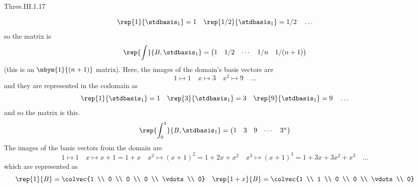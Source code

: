 \begin{ans}{Three.III.1.17}
\begin{exparts}
\begin{equation*}
            \rep{1}{\stdbasis_1}=1
            \quad \rep{1/2}{\stdbasis_1}=1/2
            \quad \ldots
          \end{equation*}
          so the matrix is
          \begin{equation*}
            \rep{\int}{B,\stdbasis_1}
            =\begin{pmatrix}
              1  &1/2 &\cdots  &1/n    &1/(n+1)
            \end{pmatrix}
          \end{equation*}
          (this is an $\nbym{1}{(n+1)}$ matrix).
        \partsitem Here, the images of the domain's basis vectors are
          \begin{equation*}
            1\mapsto 1
            \quad x\mapsto 3
            \quad x^2\mapsto 9
            \quad \ldots
          \end{equation*}
          and they are represented in the codomain as
          \begin{equation*}
            \rep{1}{\stdbasis_1}=1
            \quad\rep{3}{\stdbasis_1}=3
            \quad\rep{9}{\stdbasis_1}=9
            \quad \ldots
          \end{equation*}
          and so the matrix is this.
          \begin{equation*}
            \rep{\int_0^1}{B,\stdbasis_1}
            =\begin{pmatrix}
              1  &3   &9  &\cdots  &3^n
            \end{pmatrix}
          \end{equation*}
        \partsitem The images of the basis vectors from the domain are
          \begin{equation*}
          1\mapsto 1
          \quad x\mapsto x+1=1+x
          \quad x^2\mapsto (x+1)^2=1+2x+x^2
          \quad x^3\mapsto (x+1)^3=1+3x+3x^2+x^3
          \quad \ldots
          \end{equation*}
          which are represented as
          \begin{equation*}
            \rep{1}{B}=\colvec{1 \\ 0 \\ 0 \\ 0 \\ \vdots \\ 0}
            \quad
            \rep{1+x}{B}=\colvec{1 \\ 1 \\ 0 \\ 0 \\ \vdots \\ 0}

\end{equation*}
\end{exparts}
\end{ans}
